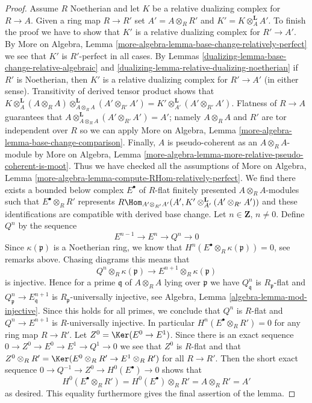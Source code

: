 \begin{proof}
\medskip\noindent
Assume $R$ Noetherian and let $K$ be a relative dualizing complex
for $R \to A$. Given a ring map $R \to R'$ set $A' = A \otimes_R R'$
and $K' = K \otimes_A^\mathbf{L} A'$. To finish the proof we have
to show that $K'$ is a relative dualizing complex for $R' \to A'$.
By More on Algebra, Lemma
\ref{more-algebra-lemma-base-change-relatively-perfect}
we see that $K'$ is $R'$-perfect in all cases.
By Lemmas \ref{dualizing-lemma-base-change-relative-algebraic} and
\ref{dualizing-lemma-relative-dualizing-noetherian}
if $R'$ is Noetherian, then $K'$ is a relative dualizing complex
for $R' \to A'$ (in either sense).
Transitivity of derived tensor product shows that
$K \otimes_A^\mathbf{L} (A \otimes_R A)
\otimes_{A \otimes_R A}^\mathbf{L} (A' \otimes_{R'} A') =
K' \otimes_{A'}^\mathbf{L} (A' \otimes_{R'} A')$.
Flatness of $R \to A$ guarantees that
$A \otimes_{A \otimes_R A}^\mathbf{L} (A' \otimes_{R'} A') = A'$;
namely $A \otimes_R A$ and $R'$ are tor independent over $R$
so we can apply More on Algebra, Lemma
\ref{more-algebra-lemma-base-change-comparison}.
Finally, $A$ is pseudo-coherent as an $A \otimes_R A$-module
by More on Algebra, Lemma
\ref{more-algebra-lemma-more-relative-pseudo-coherent-is-moot}. Thus
we have checked all the assumptions of
More on Algebra, Lemma
\ref{more-algebra-lemma-compute-RHom-relatively-perfect}.
We find there exists a bounded below complex
$E^\bullet$ of $R$-flat finitely presented $A \otimes_R A$-modules
such that $E^\bullet \otimes_R R'$ represents
$R\Hom_{A' \otimes_{R'} A'}(A',
K' \otimes_{A'}^\mathbf{L} (A' \otimes_{R'} A'))$
and these identifications are compatible with derived base change.
Let $n \in \mathbf{Z}$, $n \not = 0$.
Define $Q^n$ by the sequence
$$
E^{n - 1} \to E^n \to Q^n \to 0
$$
Since $\kappa(\mathfrak p)$ is a Noetherian ring, we know that
$H^n(E^\bullet \otimes_R \kappa(\mathfrak p)) = 0$, see remarks above.
Chasing diagrams this means that
$$
Q^n \otimes_R \kappa(\mathfrak p) \to E^{n + 1} \otimes_R \kappa(\mathfrak p)
$$
is injective. Hence for a prime $\mathfrak q$ of $A \otimes_R A$
lying over $\mathfrak p$ we have $Q^n_\mathfrak q$ is $R_\mathfrak p$-flat
and $Q^n_\mathfrak p \to E^{n + 1}_\mathfrak q$ is
$R_\mathfrak p$-universally injective, see
Algebra, Lemma \ref{algebra-lemma-mod-injective}.
Since this holds for all primes,
we conclude that $Q^n$ is $R$-flat
and $Q^n \to E^{n + 1}$ is $R$-universally injective. In particular
$H^n(E^\bullet \otimes_R R') = 0$ for any ring map $R \to R'$.
Let $Z^0 = \Ker(E^0 \to E^1)$. Since there is an exact sequence
$0 \to Z^0 \to E^0 \to E^1 \to Q^1 \to 0$ we see that $Z^0$
is $R$-flat and that
$Z^0 \otimes_R R' = \Ker(E^0 \otimes_R R' \to E^1 \otimes_R R')$
for all $R \to R'$. Then the short exact sequence
$0 \to Q^{-1} \to Z^0 \to H^0(E^\bullet) \to 0$
shows that
$$
H^0(E^\bullet \otimes_R R') = H^0(E^\bullet) \otimes_R R'
= A \otimes_R R' = A'
$$
as desired. This equality furthermore gives the final assertion
of the lemma.
\end{proof}

